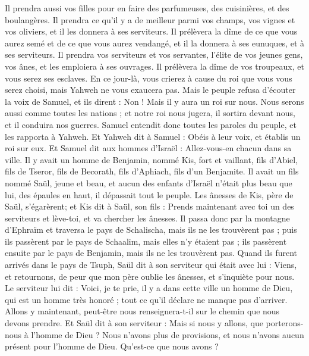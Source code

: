 \begin{multicols}{2}
Il prendra aussi vos filles pour en faire des parfumeuses, des cuisinières, et des boulangères.
Il prendra ce qu'il y a de meilleur parmi vos champs, vos vignes et vos oliviers, et il les donnera à ses serviteurs.
Il prélèvera la dîme de ce que vous aurez semé et de ce que vous aurez vendangé, et il la donnera à ses eunuques, et à ses serviteurs.
Il prendra vos serviteurs et vos servantes, l'élite de vos jeunes gens, vos ânes, et les emploiera à ses ouvrages.
Il prélèvera la dîme de vos troupeaux, et vous serez ses esclaves.
En ce jour-là, vous crierez à cause du roi que vous vous serez choisi, mais Yahweh ne vous exaucera pas.
Mais le peuple refusa d'écouter la voix de Samuel, et ils dirent : Non ! Mais il y aura un roi sur nous.
Nous serons aussi comme toutes les nations ; et notre roi nous jugera, il sortira devant nous, et il conduira nos guerres.
Samuel entendit donc toutes les paroles du peuple, et les rapporta à Yahweh.
Et Yahweh dit à Samuel : Obéis à leur voix, et établis un roi sur eux. Et Samuel dit aux hommes d'Israël : Allez-vous-en chacun dans sa ville.
\VerseOne{}Il y avait un homme de Benjamin, nommé Kis, fort et vaillant, fils d'Abiel, fils de Tseror, fils de Becorath, fils d'Aphiach, fils d'un Benjamite.
Il avait un fils nommé Saül, jeune et beau, et aucun des enfants d'Israël n'était plus beau que lui, des épaules en haut, il dépassait tout le peuple.
Les ânesses de Kis, père de Saül, s'égarèrent; et Kis dit à Saül, son fils : Prends maintenant avec toi un des serviteurs et lève-toi, et va chercher les ânesses.
Il passa donc par la montagne d'Ephraïm et traversa le pays de Schalischa, mais ils ne les trouvèrent pas ; puis ils passèrent par le pays de Schaalim, mais elles n'y étaient pas ; ils passèrent ensuite par le pays de Benjamin, mais ils ne les trouvèrent pas.
Quand ils furent arrivés dans le pays de Tsuph, Saül dit à son serviteur qui était avec lui : Viens, et retournons, de peur que mon père oublie les ânesses, et s'inquiète pour nous.
Le serviteur lui dit : Voici, je te prie, il y a dans cette ville un homme de Dieu, qui est un homme très honoré ; tout ce qu'il déclare ne manque pas d'arriver. Allons y maintenant, peut-être nous renseignera-t-il sur le chemin que nous devons prendre.
Et Saül dit à son serviteur : Mais si nous y allons, que porterons-nous à l'homme de Dieu ? Nous n'avons plus de provisions, et nous n'avons aucun présent pour l'homme de Dieu. Qu'est-ce que nous avons ?

\end{multicols}

